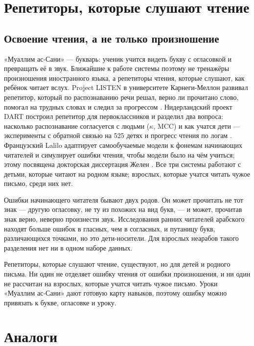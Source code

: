 \section{Репетиторы, которые слушают чтение}\label{sec:lr-tutors}

\subsection{Освоение чтения, а не только произношение}

«Муаллим ас-Сани» --- букварь: ученик учится видеть букву с огласовкой и превращать её в звук. Ближайшие к
работе системы поэтому не тренажёры произношения иностранного языка, а репетиторы чтения, которые слушают,
как ребёнок читает вслух. Project LISTEN в университете Карнеги-Меллон развивал
репетитор, который по распознаванию речи решал, верно ли прочитано слово, помогал на трудных словах и
следил за прогрессом \cite{SRC-125}. Нидерландский проект DART построил репетитор для первоклассников и
разделил два вопроса: насколько распознавание согласуется с людьми ($\kappa$, MCC) и как учатся дети ---
эксперименты с обратной связью на 525 детях и прогресс чтения по логам \cite{SRC-130,SRC-131}.
Французский Lalilo адаптирует самообучаемые модели к фонемам начинающих читателей и симулирует ошибки чтения,
чтобы модели было на чём учиться; этому посвящена докторская диссертация Желен \cite{SRC-132,SRC-133}.
Все три системы работают с детьми, которые читают на родном языке; взрослых, которые учатся читать чужое
письмо, среди них нет.

Ошибки начинающего читателя бывают двух родов. Он может прочитать не тот знак --- другую огласовку, не ту из
похожих на вид букв, --- и может, прочитав знак верно, неверно произнести звук. Исследования ранних читателей
арабского находят больше ошибок в гласных, чем в согласных, и путаницу букв, различающихся точками, но это
дети-носители. Для взрослых неарабов такого разделения нет ни в одном наборе данных.

\begin{keybox}[Вывод]
Репетиторы, которые слушают чтение, существуют, но для детей и родного письма. Ни один не отделяет ошибку
чтения от ошибки произношения, и ни один не рассчитан на взрослых, которые учатся читать чужое письмо. Уроки
«Муаллим ас-Сани» дают готовую карту навыков, поэтому ошибку можно привязать к букве, огласовке и уроку.
\end{keybox}

\section{Аналоги}\label{sec:lr-related}

